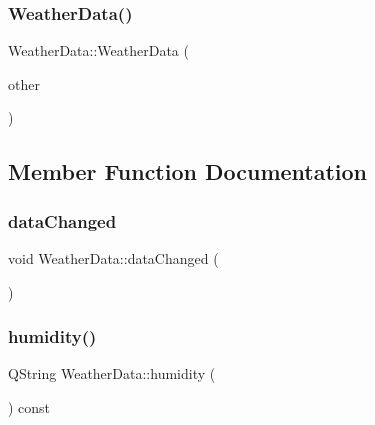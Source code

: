 \mbox{\label{class_weather_data_a48baeaa6b2a77d2a5e008159188416e8}} 
\subsubsection{\texorpdfstring{Weather\+Data()}{WeatherData()}\hspace{0.1cm}{\footnotesize\ttfamily [2/2]}}
{\footnotesize\ttfamily Weather\+Data\+::\+Weather\+Data (\begin{DoxyParamCaption}\item[{const \hyperlink{class_weather_data}{Weather\+Data} \&}]{other }\end{DoxyParamCaption})}



\subsection{Member Function Documentation}
\mbox{\label{class_weather_data_a23185106cf22ef8c57c96154e37b24d1}} 
\subsubsection{\texorpdfstring{data\+Changed}{dataChanged}}
{\footnotesize\ttfamily void Weather\+Data\+::data\+Changed (\begin{DoxyParamCaption}{ }\end{DoxyParamCaption})\hspace{0.3cm}{\ttfamily [signal]}}

\mbox{\label{class_weather_data_a0a83b2ee5398eaba062e3c6fe9264a3d}} 
\subsubsection{\texorpdfstring{humidity()}{humidity()}}
{\footnotesize\ttfamily Q\+String Weather\+Data\+::humidity (\begin{DoxyParamCaption}{ }\end{DoxyParamCaption}) const}

